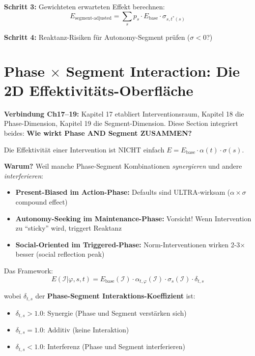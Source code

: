 \textbf{Schritt 3:} Gewichteten erwarteten Effekt berechnen:
\begin{equation}
E_{\text{segment-adjusted}} = \sum_s p_s \cdot E_{\text{base}} \cdot \sigma_{s,t^*(s)}
\label{eq:19-expected-effect}
\end{equation}

\textbf{Schritt 4:} Reaktanz-Risiken für Autonomy-Segment prüfen ($\sigma < 0$?)


\section{Phase $\times$ Segment Interaction: Die 2D Effektivitäts-Oberfläche}
\label{sec:19-phase-segment}

\textbf{Verbindung Ch17--19:} Kapitel 17 etabliert Interventionsraum, Kapitel 18 die Phase-Dimension, Kapitel 19 die Segment-Dimension. Diese Section integriert beides: \textbf{Wie wirkt Phase AND Segment ZUSAMMEN?}

\begin{tcolorbox}[colback=red!5!white, colframe=red!75!black, title=\textbf{Die kritische Einsicht: Phase × Segment Interaktion}]

Die Effektivität einer Intervention ist NICHT einfach $E = E_{\text{base}} \cdot \alpha(t) \cdot \sigma(s)$.

\textbf{Warum?} Weil manche Phase-Segment Kombinationen \textit{synergieren} und andere \textit{interferieren}:

\begin{itemize}[nosep]
\item \textbf{Present-Biased im Action-Phase:} Defaults sind ULTRA-wirksam ($\alpha \times \sigma$ compound effect)
\item \textbf{Autonomy-Seeking im Maintenance-Phase:} Vorsicht! Wenn Intervention zu ``sticky'' wird, triggert Reaktanz
\item \textbf{Social-Oriented im Triggered-Phase:} Norm-Interventionen wirken 2-3× besser (social reflection peak)
\end{itemize}

Das Framework:
\begin{equation}
\boxed{E(\mathcal{I} | \varphi, s, t) = E_{\text{base}}(\mathcal{I}) \cdot \alpha_{t,\varphi}(\mathcal{I}) \cdot \sigma_s(\mathcal{I}) \cdot \delta_{t,s}}
\label{eq:19-phase-segment}
\end{equation}

wobei $\delta_{t,s}$ der \textbf{Phase-Segment Interaktions-Koeffizient} ist:
\begin{itemize}[nosep]
\item $\delta_{t,s} > 1.0$: Synergie (Phase und Segment verstärken sich)
\item $\delta_{t,s} = 1.0$: Additiv (keine Interaktion)
\item $\delta_{t,s} < 1.0$: Interferenz (Phase und Segment interferieren)
\end{itemize}

\end{tcolorbox}

